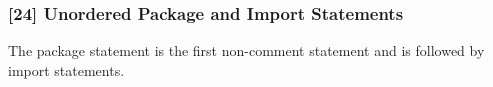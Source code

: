 \subsubsection{[24] Unordered Package and Import Statements}
The package statement is the first non-comment statement and is followed by import statements.